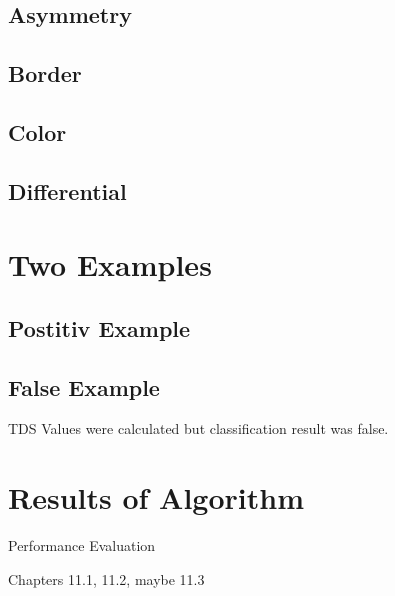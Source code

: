 \subsection{Asymmetry}


\subsection{Border}


\subsection{Color}


\subsection{Differential}

\section{Two Examples}
\subsection{Postitiv Example}

\subsection{False Example}

TDS Values were calculated but classification result was false.

\section{Results of Algorithm}

Performance Evaluation

Chapters 11.1, 11.2, maybe 11.3